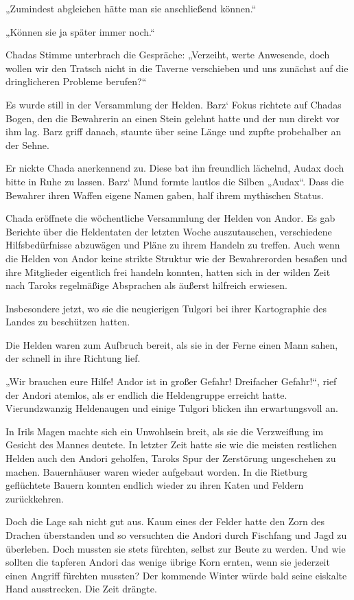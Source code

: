 „Zumindest abgleichen hätte man sie anschließend können.“

„Können sie ja später immer noch.“

Chadas Stimme unterbrach die Gespräche: „Verzeiht, werte Anwesende, doch wollen wir den Tratsch nicht in die Taverne verschieben und uns zunächst auf die dringlicheren Probleme berufen?“

Es wurde still in der Versammlung der Helden. Barz‘ Fokus richtete auf Chadas Bogen, den die Bewahrerin an einen Stein gelehnt hatte und der nun direkt vor ihm lag. Barz griff danach, staunte über seine Länge und zupfte probehalber an der Sehne.

Er nickte Chada anerkennend zu. Diese bat ihn freundlich lächelnd, Audax doch bitte in Ruhe zu lassen. Barz‘ Mund formte lautlos die Silben „Audax“. Dass die Bewahrer ihren Waffen eigene Namen gaben, half ihrem mythischen Status.

Chada eröffnete die wöchentliche Versammlung der Helden von Andor. Es gab Berichte über die Heldentaten der letzten Woche auszutauschen, verschiedene Hilfsbedürfnisse abzuwägen und Pläne zu ihrem Handeln zu treffen. Auch wenn die Helden von Andor keine strikte Struktur wie der Bewahrerorden besaßen und ihre Mitglieder eigentlich frei handeln konnten, hatten sich in der wilden Zeit nach Taroks regelmäßige Absprachen als äußerst hilfreich erwiesen.

Insbesondere jetzt, wo sie die neugierigen Tulgori bei ihrer Kartographie des Landes zu beschützen hatten.

Die Helden waren zum Aufbruch bereit, als sie in der Ferne einen Mann sahen, der schnell in ihre Richtung lief.

„Wir brauchen eure Hilfe! Andor ist in großer Gefahr! Dreifacher Gefahr!“, rief der Andori atemlos, als er endlich die Heldengruppe erreicht hatte. Vierundzwanzig Heldenaugen und einige Tulgori blicken ihn erwartungsvoll an.

In Irils Magen machte sich ein Unwohlsein breit, als sie die Verzweiflung im Gesicht des Mannes deutete. In letzter Zeit hatte sie wie die meisten restlichen Helden auch den Andori geholfen, Taroks Spur der Zerstörung ungeschehen zu machen. Bauernhäuser waren wieder aufgebaut worden. In die Rietburg geflüchtete Bauern konnten endlich wieder zu ihren Katen und Feldern zurückkehren.

Doch die Lage sah nicht gut aus. Kaum eines der Felder hatte den Zorn des Drachen überstanden und so versuchten die Andori durch Fischfang und Jagd zu überleben. Doch mussten sie stets fürchten, selbst zur Beute zu werden. Und wie sollten die tapferen Andori das wenige übrige Korn ernten, wenn sie jederzeit einen Angriff fürchten mussten? Der kommende Winter würde bald seine eiskalte Hand ausstrecken. Die Zeit drängte.

